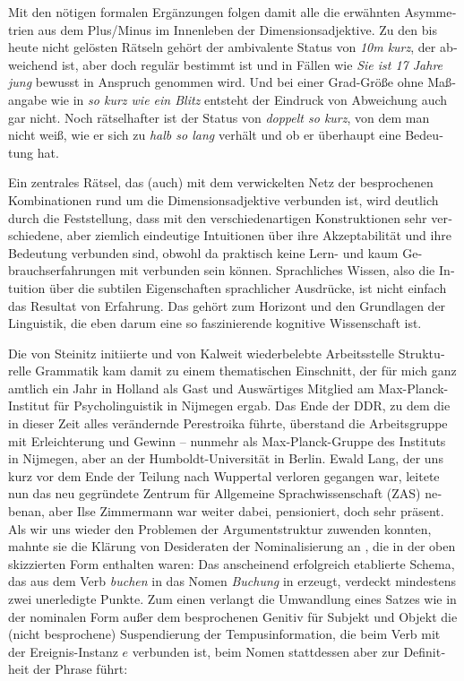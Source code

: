 \documentclass[output=paper,colorlinks,citecolor=brown]{langscibook}
\begin{document}
\begin{otherlanguage}{german}
\noindent Mit den nötigen formalen Ergänzungen folgen damit alle die erwähnten Asymmetrien aus dem Plus/Minus im Innenleben der Dimensionsadjektive. Zu den bis heute nicht gelösten Rätseln gehört der ambivalente Status von \textit{10m kurz}, der abweichend ist, aber doch regulär bestimmt ist und in Fällen wie \textit{Sie ist 17 Jahre jung} bewusst in Anspruch genommen wird. Und bei einer Grad-Größe ohne Maßangabe wie in \textit{so kurz wie ein Blitz} entsteht der Eindruck von Abweichung auch gar nicht. Noch rätselhafter ist der Status von \textit{doppelt so kurz}, von dem man nicht weiß, wie er sich zu \textit{halb so lang} verhält und ob er überhaupt eine Bedeutung hat.

Ein zentrales Rätsel, das (auch) mit dem verwickelten Netz der besprochenen Kombinationen rund um die Dimensionsadjektive verbunden ist, wird deutlich durch die Feststellung, dass mit den verschiedenartigen Konstruktionen sehr verschiedene, aber ziemlich eindeutige Intuitionen über ihre Akzeptabilität und ihre Bedeutung verbunden sind, obwohl da praktisch keine Lern- und kaum Gebrauchserfahrungen mit verbunden sein können. Sprachliches Wissen, also die Intuition über die subtilen Eigenschaften sprachlicher Ausdrücke, ist nicht einfach das Resultat von Erfahrung. Das gehört zum Horizont und den Grundlagen der Linguistik, die eben darum eine so faszinierende kognitive Wissenschaft ist.

\label{sec:5}

Die von Steinitz initiierte und von Kalweit wiederbelebte Arbeitsstelle Strukturelle Grammatik kam damit zu einem thematischen Einschnitt, der für mich ganz amtlich ein Jahr in Holland als Gast und Auswärtiges Mitglied am Max-Planck-Institut für Psycholinguistik in Nijmegen ergab. Das Ende der DDR, zu dem die in dieser Zeit alles verändernde Perestroika führte, überstand die Arbeitsgruppe mit Erleichterung und Gewinn -- nunmehr als Max-Planck-Gruppe des Instituts in Nijmegen, aber an der Humboldt-Universität in Berlin. Ewald Lang, der uns kurz vor dem Ende der Teilung nach Wuppertal verloren gegangen war, leitete nun das neu gegründete Zentrum für Allgemeine Sprachwissenschaft (ZAS) nebenan, aber Ilse Zimmermann war weiter dabei, pensioniert, doch sehr präsent. Als wir uns wieder den Problemen der Argumentstruktur zuwenden konnten, mahnte sie %
die Klärung von Desideraten der Nominalisierung an \citep{Zimmermann1991a}, die in der oben skizzierten Form enthalten waren: Das anscheinend erfolgreich etablierte Schema, das aus dem Verb \textit{buchen} in  das Nomen \textit{Buchung} in  erzeugt, verdeckt mindestens zwei unerledigte Punkte. Zum einen verlangt die Umwandlung eines Satzes wie  in der nominalen Form  außer dem besprochenen Genitiv für Subjekt und Objekt die (nicht besprochene) Suspendierung der Tempusinformation, die beim Verb mit der Ereignis-Instanz $e$ verbunden ist, beim Nomen stattdessen aber zur Definitheit der Phrase führt:


\end{otherlanguage}
\end{document}
